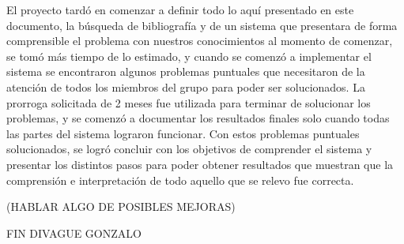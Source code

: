 El proyecto tardó en comenzar a definir todo lo aquí presentado en este documento, la búsqueda de bibliografía y de un sistema que presentara de forma comprensible el problema con nuestros conocimientos al momento de comenzar, se tomó más tiempo de lo estimado, y cuando se comenzó a implementar el sistema se encontraron algunos problemas puntuales que necesitaron de la atención de todos los miembros del grupo para poder ser solucionados. La prorroga solicitada de 2 meses fue utilizada para terminar de solucionar los problemas, y se comenzó a documentar los resultados finales solo cuando todas las partes del sistema lograron funcionar. Con estos problemas puntuales solucionados, se logró concluir con los objetivos de comprender el sistema y presentar los distintos pasos para poder obtener resultados que muestran que la comprensión e interpretación de todo aquello que se relevo fue correcta.

(HABLAR ALGO DE POSIBLES MEJORAS)

FIN DIVAGUE GONZALO


